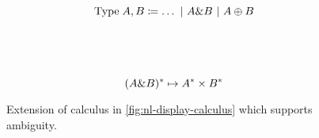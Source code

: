 \begin{figure}[h]
  \begin{mdframed}
    \centering
    \[\text{Type}\;A,B\coloneqq\ldots\vsep A\& B\vsep A\oplus B\]
    \begin{pfbox}
    \end{pfbox}
    \begin{pfbox}
    \end{pfbox}
    \begin{pfbox}
    \end{pfbox}
    \\[1\baselineskip]
    \begin{pfbox}
    \end{pfbox}
    \begin{pfbox}
    \end{pfbox}
    \begin{pfbox}
    \end{pfbox}
    \\[1\baselineskip]
    \hrulefill
    \[
      \tr[(A\& B)] \mapsto \tr[A]\times\tr[B]
    \]
    \begin{pfblock}
    \end{pfblock}
    \begin{pfblock}
    \end{pfblock}
    \begin{pfblock}
    \end{pfblock}
    \vspace*{0.5\baselineskip}
  \end{mdframed}
  \caption{
    Extension of calculus in \autoref{fig:nl-display-calculus} which supports ambiguity.}%
  \label{fig:extension-lexical-ambiguity}
\end{figure}
